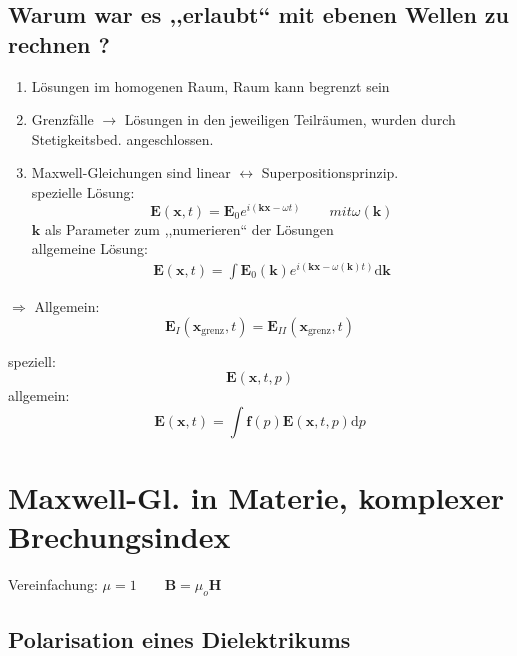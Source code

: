 \documentclass[titlepage,11pt,a4paper,ngerman]{report}
\newcommand{\tx}[1]{\textrm{#1}}
\newcommand{\dd}{\tx{d}}
\renewcommand{\vec}[1]{\boldsymbol{#1}}
\begin{document}
\subsection{Warum war es ,,erlaubt`` mit ebenen Wellen zu rechnen ?} %

\begin{enumerate}[(1)]
	\item Lösungen im homogenen Raum, Raum kann begrenzt sein
	\item Grenzfälle $ \rightarrow $ Lösungen in den jeweiligen Teilräumen, wurden durch Stetigkeitsbed. angeschlossen.
	\item Maxwell-Gleichungen sind linear $ \leftrightarrow $ Superpositionsprinzip.\\[5pt]
	spezielle Lösung:
	\begin{equation*}
	\vec{E}(\vec{x},t) = \vec{E}_0 e^{i(\vec{k} \vec{x} - \omega t)} \qquad mit \omega(\vec{k})
	\end{equation*}
	$ \vec{k} $ als Parameter zum ,,numerieren`` der Lösungen\\[5pt]
	allgemeine Lösung:
	\begin{eqnarray}
	\vec{E}(\vec{x},t) = \int \vec{E}_0(\vec{k}) e^{i(\vec{k} \vec{x} - \omega(\vec{k}) t)} \dd \vec{k}
	\end{eqnarray}
\end{enumerate}
$ \Rightarrow $ Allgemein:
\begin{equation*}
\vec{E}_I(\vec{x}_{\tx{grenz}},t) = \vec{E}_{II} (\vec{x}_{\tx{grenz}},t)
\end{equation*}


\noindent
speziell:
\begin{equation*}
\vec{E}(\vec{x},t,p)
\end{equation*}
allgemein:
\begin{equation*}
\vec{E}(\vec{x},t) = \int \vec{f}(p) \vec{E}(\vec{x},t,p) \dd p
\end{equation*}

\section{Maxwell-Gl. in Materie, komplexer Brechungsindex}

Vereinfachung: $ \mu = 1 \qquad \vec{B} = \mu_o \vec{H} $

\subsection{Polarisation eines Dielektrikums}
\end{document}
